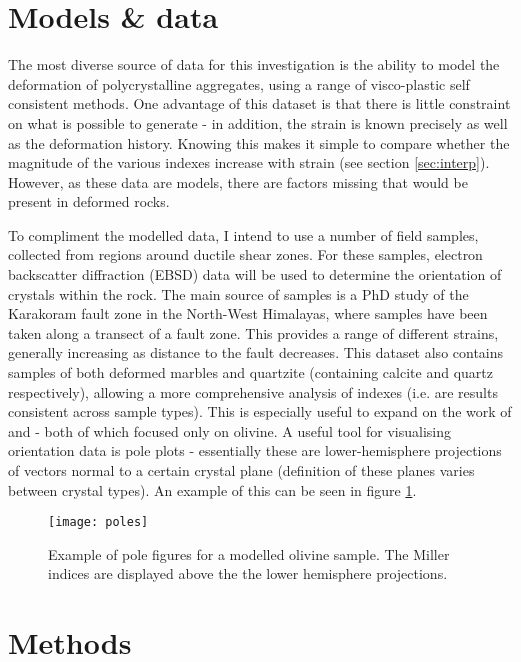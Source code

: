 \documentclass[a4paper,11pt]{article}
\numberwithin{equation}{section}
\begin{document}
\section{Models \& data}
The most diverse source of data for this investigation is the ability to model the deformation of polycrystalline aggregates, using a range of visco-plastic self consistent methods. One advantage of this dataset is that there is little constraint on what is possible to generate - in addition, the strain is known precisely as well as the deformation history. Knowing this makes it simple to compare whether the magnitude  of the various indexes increase with strain (see section \ref{sec:interp}). However, as these data are models, there are factors missing that would be present in deformed rocks.   

To compliment the modelled data, I intend to use a number of field samples, collected from regions around ductile shear zones. For these samples, electron backscatter diffraction (EBSD) data will be used to determine the orientation of crystals within the rock. The main source of samples is a PhD study of the Karakoram fault zone in the North-West Himalayas, where samples have been taken along a transect of a fault zone. This provides a range of different strains, generally increasing as distance to the fault decreases. This dataset also contains samples of both deformed marbles and quartzite (containing calcite and quartz respectively), allowing a more comprehensive analysis of indexes (i.e. are results consistent across sample types). This is especially useful to expand on the work of \cite{Mainprice} and \cite{Skemer} - both of which focused only on olivine. A useful tool for visualising orientation data is pole plots - essentially these are lower-hemisphere projections of vectors normal to a certain crystal plane (definition of these planes varies between crystal types). An example of this can be seen in figure \ref{fig:pole_plot}.

\begin{figure}[h]
  \centering
    \texttt{[image: poles]}
  \caption{Example of pole figures for a modelled olivine sample. The Miller indices are displayed above the the lower hemisphere projections.}
  \label{fig:pole_plot}
\end{figure}

\section{Methods} \label{sec:methods} 
\end{document}
